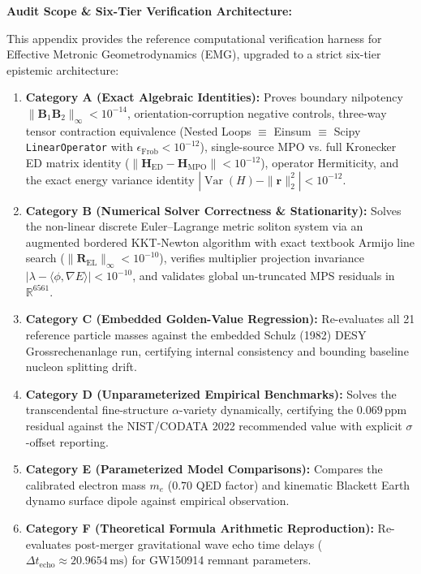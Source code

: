 \documentclass[
    12pt,
    a4paper,
    headings=normal,
    twoside=false,
    open=any,
    parskip=half
]{scrbook}
\begin{document}
\begin{firewallbox}
\textbf{Audit Scope \& Six-Tier Verification Architecture:}\par\smallskip\noindent
This appendix provides the reference computational verification harness for Effective Metronic Geometrodynamics (EMG), upgraded to a strict six-tier epistemic architecture:
\begin{enumerate}[label=\textbf{\Alph*.}]
    \item \textbf{Category A (Exact Algebraic Identities):} Proves boundary nilpotency $\|\mathbf{B}_1\mathbf{B}_2\|_\infty < 10^{-14}$, orientation-corruption negative controls, three-way tensor contraction equivalence (Nested Loops $\equiv$ Einsum $\equiv$ Scipy \texttt{LinearOperator} with $\epsilon_{\text{Frob}} < 10^{-12}$), single-source MPO vs. full Kronecker ED matrix identity ($\|\mathbf{H}_{\text{ED}} - \mathbf{H}_{\text{MPO}}\| < 10^{-12}$), operator Hermiticity, and the exact energy variance identity $|\operatorname{Var}(H) - \|\mathbf{r}\|_2^2| < 10^{-12}$.
    \item \textbf{Category B (Numerical Solver Correctness \& Stationarity):} Solves the non-linear discrete Euler--Lagrange metric soliton system via an augmented bordered KKT-Newton algorithm with exact textbook Armijo line search ($\|\mathbf{R}_{\text{EL}}\|_\infty < 10^{-10}$), verifies multiplier projection invariance $|\lambda - \langle\phi, \nabla E\rangle| < 10^{-10}$, and validates global un-truncated MPS residuals in $\mathbb{R}^{6561}$.
    \item \textbf{Category C (Embedded Golden-Value Regression):} Re-evaluates all 21 reference particle masses against the embedded Schulz (1982) DESY Grossrechenanlage run, certifying internal consistency and bounding baseline nucleon splitting drift.
    \item \textbf{Category D (Unparameterized Empirical Benchmarks):} Solves the transcendental fine-structure $\alpha$-variety dynamically, certifying the $0.069\,\text{ppm}$ residual against the NIST/CODATA 2022 recommended value with explicit $\sigma$-offset reporting.
    \item \textbf{Category E (Parameterized Model Comparisons):} Compares the calibrated electron mass $m_e$ ($0.70$ QED factor) and kinematic Blackett Earth dynamo surface dipole against empirical observation.
    \item \textbf{Category F (Theoretical Formula Arithmetic Reproduction):} Re-evaluates post-merger gravitational wave echo time delays ($\Delta t_{\text{echo}} \approx 20.9654\,\text{ms}$) for GW150914 remnant parameters.
\end{enumerate}
\end{firewallbox}
\end{document}
